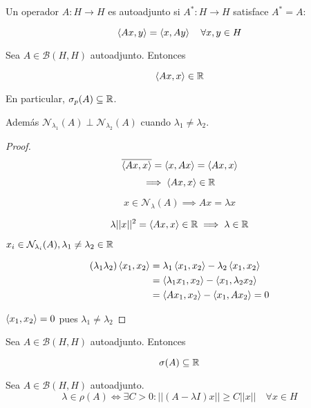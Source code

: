 \begin{fdefinition}
   Un operador $A:H\to H$ es autoadjunto si $A^*:H\to H$ satisface $A^*=A$:

   \[\left\langle Ax,y\right\rangle=\left\langle x,Ay\right\rangle\quad\forall x,y\in H\]
\end{fdefinition}

\begin{fproposition}
   Sea $A\in \mathcal{B}(H,H)$ autoadjunto. Entonces

   \[\left\langle Ax,x\right\rangle\in\mathbb{R}\]

   En particular, $\sigma_p(A)\subseteq \mathbb{R}$.

   Además $\mathcal{N}_{\lambda_1}(A)\perp\mathcal{N}_{\lambda_2}(A)$ cuando $\lambda_1\neq \lambda_2$.
\end{fproposition}

\begin{proof}
   \begin{align*}
      \overline{\left\langle Ax,x\right\rangle}=\left\langle x,Ax\right\rangle=\left\langle Ax,x\right\rangle
   \end{align*}
   \[\implies \left\langle Ax,x\right\rangle\in\mathbb{R}\]

   \[x\in \mathcal{N}_{\lambda}(A)\implies Ax=\lambda x\]

   \[\lambda ||x||^2=\left\langle Ax,x\right\rangle\in\mathbb{R}\implies \lambda\in\mathbb{R}\]

   $x_i\in\mathcal{N}_{\lambda_i}(A),\lambda_1\neq\lambda_2\in\mathbb{R}$

   \begin{align*}
      (\lambda_1\lambda_2)\left\langle x_1,x_2\right\rangle&=\lambda_1\left\langle x_1,x_2\right\rangle-\lambda_2\left\langle x_1,x_2\right\rangle\\
      &=\left\langle \lambda_1x_1,x_2\right\rangle-\left\langle x_1,\lambda_2x_2\right\rangle\\
      &=\left\langle Ax_1,x_2\right\rangle-\left\langle x_1,Ax_2\right\rangle=0
   \end{align*}

   $\left\langle x_1,x_2\right\rangle=0$ pues $\lambda_1\neq \lambda_2$
\end{proof}

\begin{ftheorem}
   Sea $A\in\mathcal{B}(H,H)$ autoadjunto. Entonces 

   \[\sigma(A)\subseteq \mathbb{R}\]
\end{ftheorem}

\begin{flemma}
   Sea $A\in\mathcal{B}(H,H)$ autoadjunto. \[\lambda\in\rho(A)\iff\exists C>0:||(A-\lambda I)x||\geq C||x||\quad\forall x\in H\]
\end{flemma}

